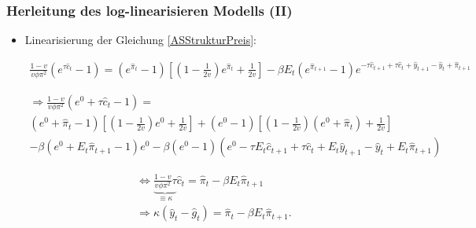 \documentclass[10pt]{beamer}  %
\begin{document}
\begin{frame}\frametitle{Herleitung des log-linearisieren Modells (II)}
\begin{itemize}
\item Linearisierung der Gleichung \eqref{ASStrukturPreis}:
\begin{tiny}\begin{align*}
    \frac{1-v}{v \phi \pi^2 } \left(e^{\tau \widehat{c}_{t}}-1\right) = \left(e^{\widehat{\pi}_t}-1\right) \left[\left(1-\frac{1}{2v}\right)e^{\widehat{\pi}_t} + \frac{1}{2v}\right]
- \beta E_t \left(e^{\widehat{\pi}_{t+1}}-1\right)e^{-\tau \widehat{c}_{t+1} + \tau \widehat{c}_t + \widehat{y}_{t+1} - \widehat{y}_t + \widehat{\pi}_{t+1}}
\end{align*}
\end{tiny}
\begin{scriptsize}\begin{multline*}
\Rightarrow \frac{1-v}{v \phi \pi^2} \left(e^0+\tau \widehat{c}_t -1\right) =\\ \left(e^0 + \widehat{\pi}_t -1\right) \left[\left(1-\frac{1}{2v}\right)e^0 + \frac{1}{2v}\right]
+\left(e^0-1\right) \left[\left(1-\frac{1}{2v}\right)\left(e^0+\widehat{\pi}_t\right)+\frac{1}{2v}\right]\\
-\beta \left(e^0+E_t\widehat{\pi}_{t+1}-1\right)e^0
- \beta \left(e^0-1\right)\left(e^0 - \tau E_t \widehat{c}_{t+1}+\tau \widehat{c}_t + E_t \widehat{y}_{t+1}- \widehat{y}_t + E_t \widehat{\pi}_{t+1}\right)
\end{multline*}
\end{scriptsize}
\begin{scriptsize}\begin{align*}
    \Leftrightarrow \underbrace{\frac{1-v}{v\phi \pi^2} \tau}_{\equiv \kappa} \widehat{c}_t = \widehat{\pi}_t - \beta E_t \widehat{\pi}_{t+1}\\
    \Rightarrow \kappa \left(\widehat{y}_t -\widehat{g}_t\right) = \widehat{\pi}_t - \beta E_t \widehat{\pi}_{t+1}.
\end{align*}
\end{scriptsize}
\end{itemize}
\hyperlink{Loglin}{}
\end{frame}
\end{document}
